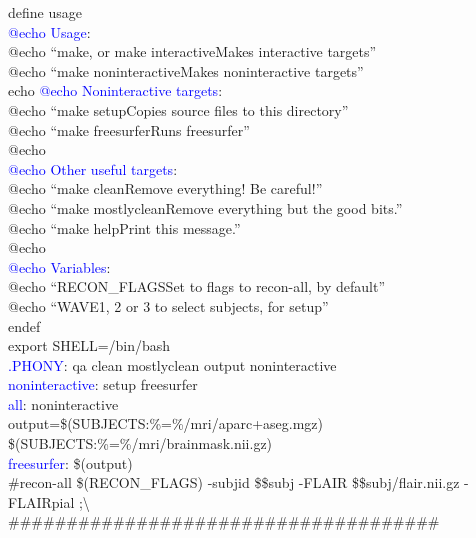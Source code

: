 \documentclass[oneside,11pt]{memoir}
\newcommand{\maker}[2]{\textcolor{blue}{#1}:\enspace#2}
\newcommand{\tab}{\hspace*{4em}}
\begin{document}
	define usage \\
	\maker{   @echo Usage}{} \\
	@echo ``make, or make interactive\tab Makes interactive targets'' \\ 
	@echo ``make noninteractive\tab \tab Makes noninteractive targets'' \\ 
	echo 
	\maker{   @echo Noninteractive targets}{} \\
	@echo ``make setup\tab \tab \tab Copies source files to this directory'' \\ 
	@echo ``make freesurfer\tab \tab Runs freesurfer'' \\ 
	@echo \\
	\maker{   @echo Other useful targets}{} \\
	@echo ``make clean\tab \tab \tab Remove everything! Be careful!'' \\ 
	@echo ``make mostlyclean\tab \tab Remove everything but the good bits.'' \\ 
	@echo ``make help\tab \tab \tab Print this message.'' \\ 
	@echo \\
	\maker{   @echo Variables}{} \\
	@echo ``RECON_FLAGS\tab \tab \tab Set to flags to recon-all, by default'' \\ 
	@echo ``WAVE\tab \tab \tab \tab 1, 2 or 3 to select subjects, for setup'' \\ 
	endef \\
	
	export SHELL=/bin/bash \\
	
	\maker{.PHONY}{ qa clean mostlyclean output noninteractive } \\
	
	\maker{noninteractive}{ setup freesurfer} \\
	
	\maker{all}{ noninteractive} \\
	
	output=\$(SUBJECTS:\%=\%/mri/aparc+aseg.mgz) \$(SUBJECTS:\%=\%/mri/brainmask.nii.gz) \\
	\maker{freesurfer}{ \$(output)} \\
	
	\#recon-all \$(RECON_FLAGS) -subjid  \$\${subj} -FLAIR \$\${subj}/flair.nii.gz -FLAIRpial ;\textbackslash \\
	
	\#\#\#\#\#\#\#\#\#\#\#\#\#\#\#\#\#\#\#\#\#\#\#\#\#\#\#\#\#\#\#\#\#\#\#\#\# \\
	
\end{document}
